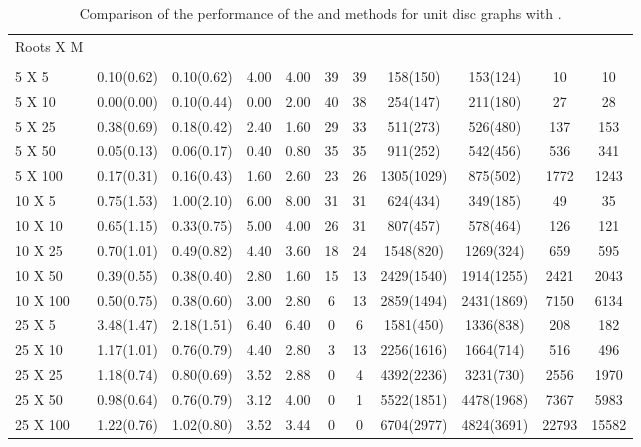 \begin{table*}[htb]
\footnotesize
\center
\caption{\label{table:Alpha15}
Comparison of the performance of the  and  methods for  unit disc graphs with .}
\begin{tabularx}{430pt}{X*{10}{c}}

\toprule
Roots X M&  \multicolumn{2}{c}{}  & \multicolumn{2}{c}{} & \multicolumn{2}{c}{}& \multicolumn{2}{c}{}& \multicolumn{2}{c}{}\\
&  &   &   &  &   & &  & &   & \\

\midrule
5 X 5 & 0.10(0.62) & 0.10(0.62) & 4.00 & 4.00 & 39 & 39 & 158(150) & 153(124) & 10 & 10 \\
5 X 10 & 0.00(0.00) & 0.10(0.44) & 0.00 & 2.00 & 40 & 38 & 254(147) & 211(180) & 27 & 28 \\
5 X 25 & 0.38(0.69) & 0.18(0.42) & 2.40 & 1.60 & 29 & 33 & 511(273) & 526(480) & 137 & 153 \\
5 X 50 & 0.05(0.13) & 0.06(0.17) & 0.40 & 0.80 & 35 & 35 & 911(252) & 542(456) & 536 & 341 \\
5 X 100 & 0.17(0.31) & 0.16(0.43) & 1.60 & 2.60 & 23 & 26 & 1305(1029) & 875(502) & 1772 & 1243 \\
\midrule
10 X 5 & 0.75(1.53) & 1.00(2.10) & 6.00 & 8.00 & 31 & 31 & 624(434) & 349(185) & 49 & 35 \\
10 X 10 & 0.65(1.15) & 0.33(0.75) & 5.00 & 4.00 & 26 & 31 & 807(457) & 578(464) & 126 & 121 \\
10 X 25 & 0.70(1.01) & 0.49(0.82) & 4.40 & 3.60 & 18 & 24 & 1548(820) & 1269(324) & 659 & 595 \\
10 X 50 & 0.39(0.55) & 0.38(0.40) & 2.80 & 1.60 & 15 & 13 & 2429(1540) & 1914(1255) & 2421 & 2043 \\
10 X 100 & 0.50(0.75) & 0.38(0.60) & 3.00 & 2.80 & 6 & 13 & 2859(1494) & 2431(1869) & 7150 & 6134 \\
\midrule
25 X 5 & 3.48(1.47) & 2.18(1.51) & 6.40 & 6.40 & 0 & 6 & 1581(450) & 1336(838) & 208 & 182 \\
25 X 10 & 1.17(1.01) & 0.76(0.79) & 4.40 & 2.80 & 3 & 13 & 2256(1616) & 1664(714) & 516 & 496 \\
25 X 25 & 1.18(0.74) & 0.80(0.69) & 3.52 & 2.88 & 0 & 4 & 4392(2236) & 3231(730) & 2556 & 1970 \\
25 X 50 & 0.98(0.64) & 0.76(0.79) & 3.12 & 4.00 & 0 & 1 & 5522(1851) & 4478(1968) & 7367 & 5983 \\
25 X 100 & 1.22(0.76) & 1.02(0.80) & 3.52 & 3.44 & 0 & 0 & 6704(2977) & 4824(3691) & 22793 & 15582 \\

\end{tabularx}
\end{table*}
